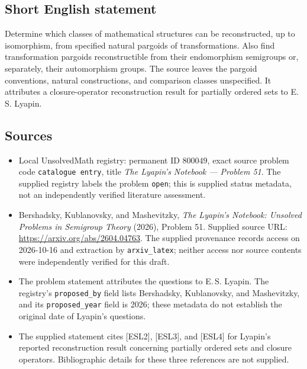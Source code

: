 \documentclass[11pt]{article}
\begin{document}
\subsection{Short English statement}
Determine which classes of mathematical structures can be reconstructed, up to isomorphism, from specified natural pargoids of transformations. Also find transformation pargoids reconstructible from their endomorphism semigroups or, separately, their automorphism groups. The source leaves the pargoid conventions, natural constructions, and comparison classes unspecified. It attributes a closure-operator reconstruction result for partially ordered sets to E.\,S. Lyapin.
\subsection{Sources}
\begin{itemize}
\item Local UnsolvedMath registry: permanent ID \(800049\), exact source problem code \texttt{catalogue entry}, title \emph{The Lyapin's Notebook --- Problem 51}. The supplied registry labels the problem \texttt{open}; this is supplied status metadata, not an independently verified literature assessment.
\item Bershadsky, Kublanovsky, and Mashevitzky, \emph{The Lyapin's Notebook: Unsolved Problems in Semigroup Theory} (2026), Problem 51. Supplied source URL: \url{https://arxiv.org/abs/2604.04763}. The supplied provenance records access on 2026-10-16 and extraction by \texttt{arxiv\_latex}; neither access nor source contents were independently verified for this draft.
\item The problem statement attributes the questions to E.\,S. Lyapin. The registry's \texttt{proposed\_by} field lists Bershadsky, Kublanovsky, and Mashevitzky, and its \texttt{proposed\_year} field is 2026; these metadata do not establish the original date of Lyapin's questions.
\item The supplied statement cites [ESL2], [ESL3], and [ESL4] for Lyapin's reported reconstruction result concerning partially ordered sets and closure operators. Bibliographic details for these three references are not supplied.
\end{itemize}
\end{document}
